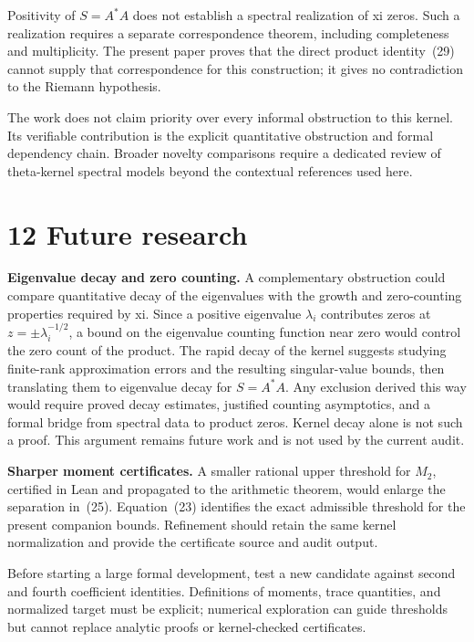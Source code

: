 \documentclass[
  11pt,
]{article}
\begin{document}
Positivity of \(S = A^{*}A\) does not establish a spectral realization of xi zeros. Such a realization requires a separate correspondence theorem, including completeness and multiplicity. The present paper proves that the direct product identity~(29) cannot supply that correspondence for this construction; it gives no contradiction to the Riemann hypothesis.

The work does not claim priority over every informal obstruction to this kernel. Its verifiable contribution is the explicit quantitative obstruction and formal dependency chain. Broader novelty comparisons require a dedicated review of theta-kernel spectral models beyond the contextual references used here.

\hypertarget{future-research}{%
\section{12 Future research}\label{future-research}}

\textbf{Eigenvalue decay and zero counting.} A complementary obstruction could compare quantitative decay of the eigenvalues with the growth and zero-counting properties required by xi. Since a positive eigenvalue \(\lambda_{i}\) contributes zeros at \(z = \pm \lambda_{i}^{- 1/2}\), a bound on the eigenvalue counting function near zero would control the zero count of the product. The rapid decay of the kernel suggests studying finite-rank approximation errors and the resulting singular-value bounds, then translating them to eigenvalue decay for \(S = A^{*}A\). Any exclusion derived this way would require proved decay estimates, justified counting asymptotics, and a formal bridge from spectral data to product zeros. Kernel decay alone is not such a proof. This argument remains future work and is not used by the current audit.

\textbf{Sharper moment certificates.} A smaller rational upper threshold for \(M_{2}\), certified in Lean and propagated to the arithmetic theorem, would enlarge the separation in~(25). Equation~(23) identifies the exact admissible threshold for the present companion bounds. Refinement should retain the same kernel normalization and provide the certificate source and audit output.

Before starting a large formal development, test a new candidate against second and fourth coefficient identities. Definitions of moments, trace quantities, and normalized target must be explicit; numerical exploration can guide thresholds but cannot replace analytic proofs or kernel-checked certificates.
\end{document}
